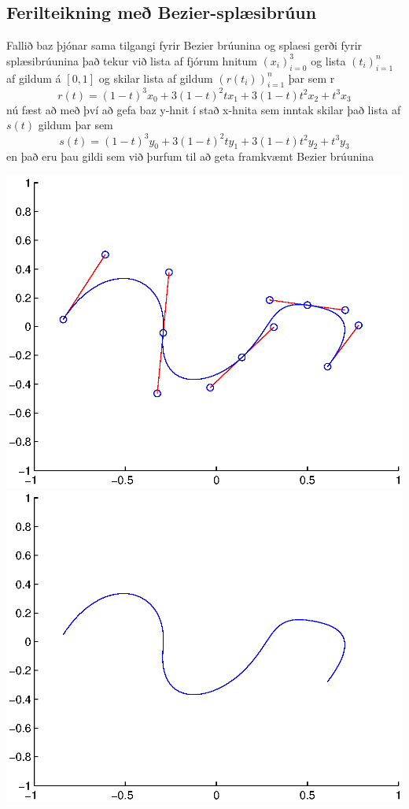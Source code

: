 \documentclass[a4]{article}
\begin{document}
\subsection{Ferilteikning með Bezier-splæsibrúun}

Fallið baz þjónar sama tilgangi fyrir Bezier brúunina og splaesi gerði fyrir splæsibrúunina það tekur við lista af fjórum hnitum $(x_i)_{i=0}^3$ og lista $(t_i)_{i=1}^n$ af gildum á $[0,1]$ og skilar lista af gildum $(r(t_i))_{i=1}^n$ þar sem  r 
$$r(t)=(1-t)^3x_0+3(1-t)^2tx_1+3(1-t)t^2x_2+t^3x_3$$
nú fæst að með því að gefa baz y-hnit í stað x-hnita sem inntak skilar það lista af $s(t)$ gildum þar sem  
$$s(t)=(1-t)^3y_0+3(1-t)^2ty_1+3(1-t)t^2y_2+t^3y_3$$
en það eru þau gildi sem við þurfum til að geta framkvæmt Bezier brúunina

\includegraphics[height=0.495\textheight]{mynd21.eps}\\
\includegraphics[height=0.495\textheight]{mynd22.eps}\\
\end{document}
